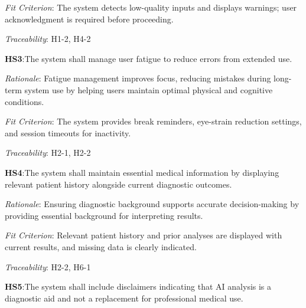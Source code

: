 \documentclass{article}
\begin{document}
\vspace{0.2cm}

\emph{Fit Criterion}: The system detects low-quality inputs and displays warnings; user acknowledgment is required before proceeding.

\vspace{0.2cm}

\emph{Traceability}: H1-2, H4-2

\vspace{0.5cm}

\textbf{HS3}:\hypertarget{HS3}{The system shall manage user fatigue to reduce errors from extended use.}
\vspace{0.2cm}

\emph{Rationale}: Fatigue management improves focus, reducing mistakes during long-term system use by helping users maintain optimal physical and cognitive conditions.

\vspace{0.2cm}

\emph{Fit Criterion}: The system provides break reminders, eye-strain reduction settings, and session timeouts for inactivity.

\vspace{0.2cm}

\emph{Traceability}: H2-1, H2-2

\vspace{0.5cm}

\textbf{HS4}:\hypertarget{HS4}{The system shall maintain essential medical information by displaying relevant patient history alongside current diagnostic outcomes.}
\vspace{0.2cm}

\emph{Rationale}: Ensuring diagnostic background supports accurate decision-making by providing essential background for interpreting results.

\vspace{0.2cm}

\emph{Fit Criterion}: Relevant patient history and prior analyses are displayed with current results, and missing data is clearly indicated.

\vspace{0.2cm}

\emph{Traceability}: H2-2, H6-1

\vspace{0.5cm}

\textbf{HS5}:\hypertarget{HS5}{The system shall include disclaimers indicating that AI analysis is a diagnostic aid and not a replacement for professional medical use.}
\vspace{0.2cm}
\end{document}

